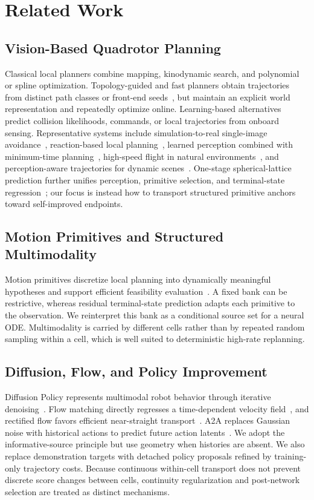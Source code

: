 \section{Related Work}

\subsection{Vision-Based Quadrotor Planning}

Classical local planners combine mapping, kinodynamic search, and polynomial or spline optimization. Topology-guided and fast planners obtain trajectories from distinct path classes or front-end seeds~\cite{zhou2019robust,ye2021tgk,zhou2019fast}, but maintain an explicit world representation and repeatedly optimize online. Learning-based alternatives predict collision likelihoods, commands, or local trajectories from onboard sensing. Representative systems include simulation-to-real single-image avoidance~\cite{sadeghi2017cad2rl}, reaction-based local planning~\cite{lu2023lpnet}, learned perception combined with minimum-time planning~\cite{penicka2022minimum}, high-speed flight in natural environments~\cite{loquercio2021learning}, and perception-aware trajectories for dynamic scenes~\cite{tordesillas2023deep}. One-stage spherical-lattice prediction further unifies perception, primitive selection, and terminal-state regression~\cite{lu2024yopo}; our focus is instead how to transport structured primitive anchors toward self-improved endpoints.

\subsection{Motion Primitives and Structured Multimodality}

Motion primitives discretize local planning into dynamically meaningful hypotheses and support efficient feasibility evaluation~\cite{nguyen2022motion}. A fixed bank can be restrictive, whereas residual terminal-state prediction adapts each primitive to the observation. We reinterpret this bank as a conditional source set for a neural ODE. Multimodality is carried by different cells rather than by repeated random sampling within a cell, which is well suited to deterministic high-rate replanning.

\subsection{Diffusion, Flow, and Policy Improvement}

Diffusion Policy represents multimodal robot behavior through iterative denoising~\cite{chi2023diffusion}. Flow matching directly regresses a time-dependent velocity field~\cite{lipman2023flow}, and rectified flow favors efficient near-straight transport~\cite{liu2023rectified}. A2A replaces Gaussian noise with historical actions to predict future action latents~\cite{jia2026a2a}. We adopt the informative-source principle but use geometry when histories are absent. We also replace demonstration targets with detached policy proposals refined by training-only trajectory costs. Because continuous within-cell transport does not prevent discrete score changes between cells, continuity regularization and post-network selection are treated as distinct mechanisms.
